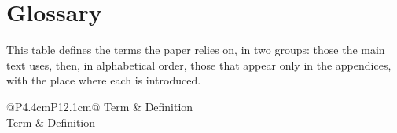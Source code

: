 \section{Glossary}\label{app:glossary}
This table defines the terms the paper relies on, in two groups: those the main text uses, then, in alphabetical order, those that appear only in the appendices, with the place where each is introduced.

{\small
\begin{longtable}{@{}P{4.4cm}P{12.1cm}@{}}
\toprule Term & Definition\\\midrule\endfirsthead
\toprule Term & Definition\\\midrule\endhead
\bottomrule\endlastfoot
{}\\
\midrule
{}\\
\end{longtable}}

